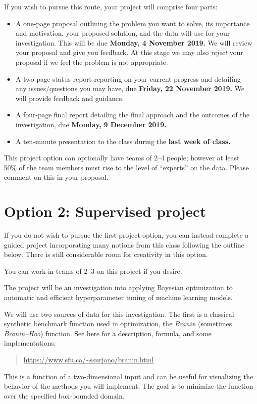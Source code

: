 \documentclass{article}
\begin{document}
If you wish to pursue this route, your project will comprise four parts:

\begin{itemize}
\item
  A one-page proposal outlining the problem you want to solve, its
  importance and motivation, your proposed solution, and the data will
  use for your investigation. This will be due \textbf{Monday, 4
    November 2019.} We will review your proposal and give you
  feedback.  At this stage we may also \emph{reject} your proposal if
  we feel the problem is not appropriate.
\item
  A two-page status report reporting on your current progress and
  detailing any issues/questions you may have, due \textbf{Friday, 22
    November 2019.}  We will provide feedback and guidance.
\item
  A four-page final report detailing the final approach and the outcomes
  of the investigation, due \textbf{Monday, 9 December 2019.}
\item
  A ten-minute presentation to the class during the \textbf{last week
    of class.}
\end{itemize}

This project option can optionally have teams of 2--4 people; however
at least 50\% of the team members must rise to the level of
``experts'' on the data. Please comment on this in your proposal.

\clearpage

\section*{Option 2: Supervised project}

If you do not wish to pursue the first project option, you can instead
complete a guided project incorporating many notions from this class
following the outline below. There is still considerable room for
creativity in this option.

You can work in teams of 2--3 on this project if you desire.

The project will be an investigation into applying Bayesian
optimization to automatic and efficient hyperparameter tuning of
machine learning models.

We will use two sources of data for this investigation. The first is a
classical synthetic benchmark function used in optimization, the
\emph{Branin} (sometimes \emph{Branin--Hoo}) function.  See here for
a description, formula, and some implementations:
\begin{quote}
  \url{https://www.sfu.ca/~ssurjano/branin.html}
\end{quote}
This is a function of a two-dimensional input and can be useful for
visualizing the behavior of the methods you will implement. The goal
is to minimize the function over the specified box-bounded domain.
\end{document}
